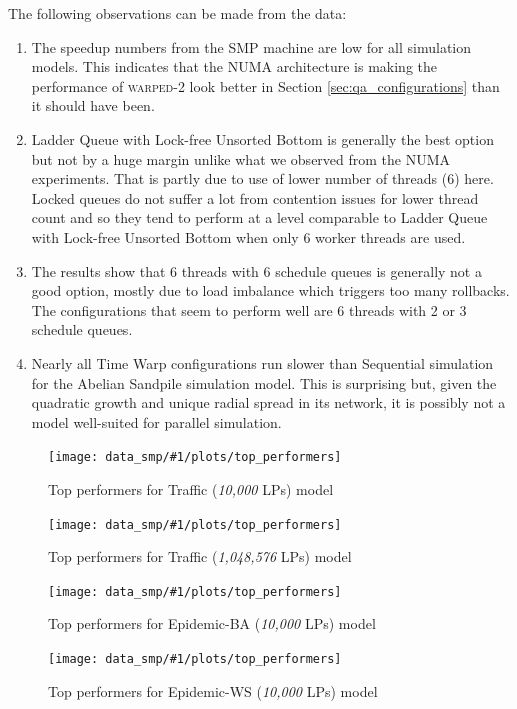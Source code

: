\documentclass[11pt]{book}
\newcommand{\plotOverallSMP}[3]{
\begin{figure}
  \centerline{\texttt{[image: data\_smp/\#1/plots/top\_performers]}}
  \caption{#2}\label{#3}
\end{figure}
}
\begin{document}
The following observations can be made from the data:

\begin{enumerate}
  \item The speedup numbers from the SMP machine are low for all simulation models. This indicates that
        the NUMA architecture is making the performance of \textsc{warped-2} look better in Section
        \ref{sec:qa_configurations} than it should have been.

  \item Ladder Queue with Lock-free Unsorted Bottom is generally the best option but not by a huge margin
        unlike what we observed from the NUMA experiments. That is partly due to use of lower number of
        threads (6) here. Locked queues do not suffer a lot from contention issues for lower thread count
        and so they tend to perform at a level comparable to Ladder Queue with Lock-free Unsorted Bottom
        when only 6 worker threads are used.

  \item The results show that 6 threads with 6 schedule queues is generally not a good option, mostly due
        to load imbalance which triggers too many rollbacks. The configurations that seem to perform well
        are 6 threads with 2 or 3 schedule queues. 

  \item Nearly all Time Warp configurations run slower than Sequential simulation for the Abelian Sandpile
        simulation model. This is surprising but, given the quadratic growth and unique radial spread in
        its network, it is possibly not a model well-suited for parallel simulation.
\end{enumerate}

\plotOverallSMP{traffic_10k}
               {Top performers for Traffic (\emph{10,000} LPs) model}
               {plot:traffic_10k:consolidated_smp}

\plotOverallSMP{traffic_1m}
               {Top performers for Traffic (\emph{1,048,576} LPs) model}
               {plot:traffic_1m:consolidated_smp}

\plotOverallSMP{epidemic_10k_ba}
               {Top performers for Epidemic-BA (\emph{10,000} LPs) model}
               {plot:epidemic_10k_ba:consolidated_smp}

\plotOverallSMP{epidemic_10k_ws}
               {Top performers for Epidemic-WS (\emph{10,000} LPs) model}
               {plot:epidemic_10k_ws:consolidated_smp}
\end{document}
